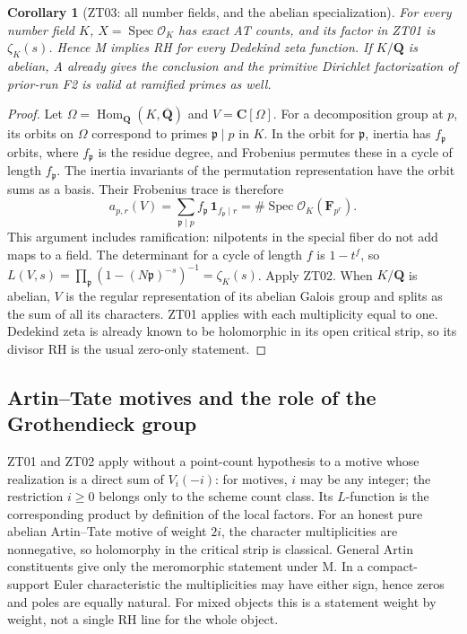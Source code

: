\documentclass[11pt,a4paper]{article}
\newtheorem{corollary}[theorem]{Corollary}
\theoremstyle{definition}
\begin{document}
\begin{corollary}[ZT03: all number fields, and the abelian specialization]
\label{ZT03}
For every number field $K$, $X=\operatorname{Spec}\mathcal O_K$ has
exact AT counts, and its factor in ZT01 is $\zeta_K(s)$.  Hence M
implies RH for every Dedekind zeta function.  If $K/\mathbf Q$ is
abelian, A already gives the conclusion and the primitive Dirichlet
factorization of prior-run F2 is valid at ramified primes as well.
\end{corollary}

\begin{proof}
Let $\Omega=\operatorname{Hom}_{\mathbf Q}(K,\overline{\mathbf Q})$
and $V=\mathbf C[\Omega]$.  For a decomposition group at $p$,
its orbits on $\Omega$ correspond to primes $\mathfrak p\mid p$ in
$K$.  In the orbit for $\mathfrak p$, inertia has $f_{\mathfrak p}$
orbits, where $f_{\mathfrak p}$ is the residue degree, and Frobenius
permutes these in a cycle of length $f_{\mathfrak p}$.
The inertia invariants of the permutation representation have the
orbit sums as a basis.  Their Frobenius trace is therefore
\[
 a_{p,r}(V)=\sum_{\mathfrak p\mid p}
 f_{\mathfrak p}\,\boldsymbol 1_{f_{\mathfrak p}\mid r}
          =\#\operatorname{Spec}\mathcal O_K(\mathbf F_{p^r}).
\]
This argument includes ramification: nilpotents in the special fiber
do not add maps to a field.  The determinant for a cycle of length
$f$ is $1-t^f$, so $L(V,s)=\prod_{\mathfrak p}
(1-(N\mathfrak p)^{-s})^{-1}=\zeta_K(s)$.  Apply ZT02.
When $K/\mathbf Q$ is abelian, $V$ is the regular representation of
its abelian Galois group and splits as the sum of all its characters.
ZT01 applies with each multiplicity equal to one.  Dedekind zeta is
already known to be holomorphic in its open critical strip, so its
divisor RH is the usual zero-only statement.
\end{proof}

\subsection{Artin--Tate motives and the role of the Grothendieck group}
ZT01 and ZT02 apply without a point-count hypothesis to a motive whose
realization is a direct sum of $V_i(-i)$: for motives, $i$ may be any integer; the restriction $i\geq0$ belongs only to the scheme count class. Its $L$-function is the
corresponding product by definition of the local factors.  For an
honest pure abelian Artin--Tate motive of weight $2i$, the character
multiplicities are nonnegative, so holomorphy in the critical strip
is classical.  General Artin constituents give only the meromorphic
statement under M.  In a compact-support Euler characteristic the
multiplicities may have either sign, hence zeros and poles are equally
natural.  For mixed objects this is a statement weight by weight,
not a single RH line for the whole object.
\end{document}
